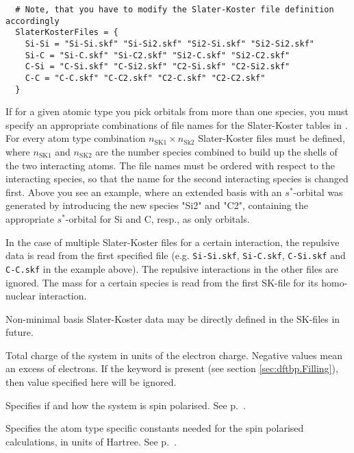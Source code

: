 \begin{description}
\begin{verbatim}
  # Note, that you have to modify the Slater-Koster file definition accordingly
  SlaterKosterFiles = {
    Si-Si = "Si-Si.skf" "Si-Si2.skf" "Si2-Si.skf" "Si2-Si2.skf"
    Si-C = "Si-C.skf" "Si-C2.skf" "Si2-C.skf" "Si2-C2.skf"
    C-Si = "C-Si.skf" "C-Si2.skf" "C2-Si.skf" "C2-Si2.skf"
    C-C = "C-C.skf" "C-C2.skf" "C2-C.skf" "C2-C2.skf"
  }
\end{verbatim}

  If for a given atomic type you pick orbitals from more than one species, you
  must specify an appropriate combinations of file names for the Slater-Koster
  tables in . For every
  atom type combination $n_{\text{SK1}}\times n_{\text{Sk2}}$ Slater-Koster
  files must be defined, where $n_{\text{SK1}}$ and $n_{\text{SK2}}$ are the
  number species combined to build up the shells of the two interacting
  atoms. The file names must be ordered with respect to the interacting species,
  so that the name for the second interacting species is changed first. Above
  you see an example, where an extended basis with an $s^*$-orbital was
  generated by introducing the new species "Si2" and "C2", containing the
  appropriate $s^*$-orbital for Si and C, resp., as only orbitals.

  In the case of multiple Slater-Koster files for a certain
  interaction, the repulsive data is read from the first specified
  file (e.g. \verb|Si-Si.skf|, \verb|Si-C.skf|, \verb|C-Si.skf| and
  \verb|C-C.skf| in the example above). The repulsive interactions in
  the other files are ignored. The mass for a certain species is read
  from the first SK-file for its homo-nuclear interaction.

  Non-minimal basis Slater-Koster data may be directly defined in the
  SK-files in future.

\item[\is{Charge}] Total charge of the system in units of the electron
  charge. Negative values mean an excess of electrons. If the keyword
   is present (see section \ref{sec:dftbp.Filling}), then value
  specified here will be ignored.

\item[\is{SpinPolarisation} / \is{SpinPolarization}] Specifies if and how the system is spin
  polarised. See p.~.

\item[\is{SpinConstants}] Specifies the atom type specific constants needed for
  the spin polarised calculations, in units of Hartree.  See
  p.~.


\end{description}
